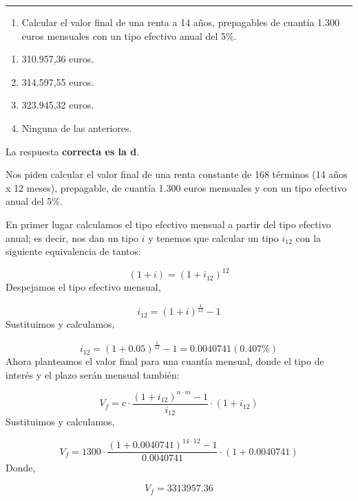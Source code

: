 \documentclass[
  letterpaper,
  DIV=11,
  numbers=noendperiod]{scrreprt}
\providecommand{\tightlist}{%
  \setlength{\itemsep}{0pt}\setlength{\parskip}{0pt}}\usepackage{longtable,booktabs,array}
\begin{document}
\begin{center}\rule{0.5\linewidth}{0.5pt}\end{center}

\begin{enumerate}
\def\labelenumi{\arabic{enumi}.}
\setcounter{enumi}{75}
\tightlist
\item
  Calcular el valor final de una renta a 14 años, prepagables de cuantía
  1.300 euros mensuales con un tipo efectivo anual del 5\%.
\end{enumerate}

\begin{enumerate}
\def\labelenumi{\alph{enumi}.}
\item
  310.957,36 euros.
\item
  314.597,55 euros.
\item
  323.945,32 euros.
\item
  Ninguna de las anteriores.
\end{enumerate}

\begin{tcolorbox}[enhanced jigsaw, left=2mm, opacityback=0, colback=white, breakable, arc=.35mm, bottomrule=.15mm, rightrule=.15mm, toprule=.15mm, leftrule=.75mm, colframe=quarto-callout-tip-color-frame]
\begin{minipage}[t]{5.5mm}
\textcolor{quarto-callout-tip-color}{\faLightbulb}
\end{minipage}%
\begin{minipage}[t]{\textwidth - 5.5mm}

La respuesta \textbf{correcta es la d}.

Nos piden calcular el valor final de una renta constante de 168 términos
(14 años x 12 meses), prepagable, de cuantía 1.300 euros mensuales y con
un tipo efectivo anual del 5\%.

En primer lugar calculamos el tipo efectivo mensual a partir del tipo
efectivo anual; es decir, nos dan un tipo \(i\) y tenemos que calcular
un tipo \(i_{12}\) con la siguiente equivalencia de tantos:

\[\left(1+i\right)=\left(1+i_{12}\right)^{12}\] Despejamos el tipo
efectivo mensual,

\[i_{12}=(1+i)^{\frac{1 }{12 }}-1\] Sustituimos y calculamos,

\[i_{12}=(1+0.05)^{\frac{1 }{12 }}-1=0.0040741(0.407\%)\] Ahora
planteamos el valor final para una cuantía mensual, donde el tipo de
interés y el plazo serán mensual también:

\[V_f=c\cdot\frac{\left(1+i_{12}\right)^{n\cdot m}-1}{i_{12}}\cdot\left(1+i_{12}\right)\]
Sustituimos y calculamos,

\[V_f=1300\cdot\frac{\left(1+0.0040741\right)^{14\cdot 12}-1}{0.0040741}\cdot\left(1+0.0040741\right)\]
Donde,

\[V_f=3313957.36\]

\end{minipage}%
\end{tcolorbox}
\end{document}
